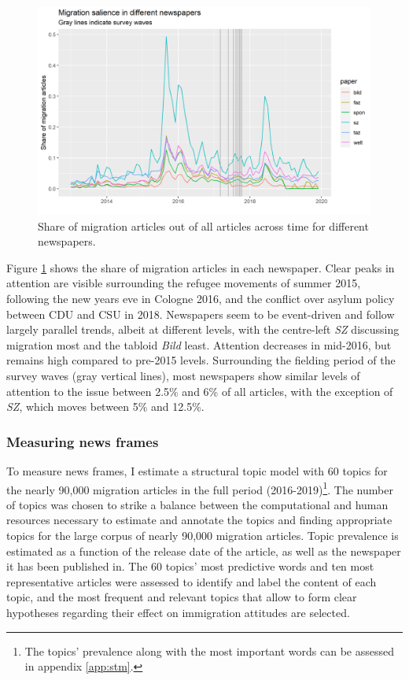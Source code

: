 \documentclass{article}
\begin{document}
\begin{figure}[!ht]
    \centering
    \includegraphics[width=\textwidth]{paper/vis/salience_papers.png}
    \caption{Share of migration articles out of all articles across time for different newspapers.}
    \label{fig:salience}
\end{figure}

Figure \ref{fig:salience} shows the share of migration articles in each newspaper. Clear peaks in attention are visible surrounding the refugee movements of summer 2015, following the new years eve in Cologne 2016, and the conflict over asylum policy between CDU and CSU in 2018. Newspapers seem to be event-driven and follow largely parallel trends, albeit at different levels, with the  centre-left \textit{SZ} discussing migration most and the tabloid \textit{Bild} least. Attention decreases in mid-2016, but remains high compared to pre-2015 levels. Surrounding the fielding period of the survey waves (gray vertical lines), most newspapers show similar levels of attention to the issue between 2.5\% and 6\% of all articles, with the exception of \textit{SZ}, which moves between 5\% and 12.5\%.



\subsubsection{Measuring news frames}\label{sec:frame_selection}

To measure news frames, I estimate a structural topic model with 60 topics for the nearly 90,000 migration articles in the full period (2016-2019)\footnote{The topics' prevalence along with the most important words can be assessed in appendix \ref{app:stm}.}. The number of topics was chosen to strike a balance between the computational and human resources necessary to estimate and annotate the topics and finding appropriate topics for the large corpus of nearly 90,000 migration articles. Topic prevalence is estimated as a function of the release date of the article, as well as the newspaper it has been published in. The 60 topics' most predictive words and ten most representative articles were assessed to identify and label the content of each topic, and the most frequent and relevant topics that allow to form clear hypotheses regarding their effect on immigration attitudes are selected. 
\end{document}
